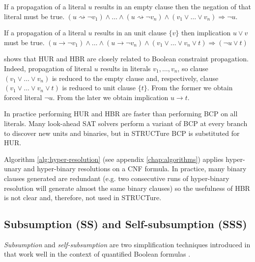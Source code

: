 \begin{myprop}
  If a propagation of a literal $u$ results in an empty clause then
  the negation of that literal must be true.
  $(u \rightsquigarrow \neg v_1) \land \ldots
  \land (u \rightsquigarrow \neg v_n) \land (v_1 \lor \dots \lor v_n)
  \Rightarrow \neg u$. 
\end{myprop}

\begin{myprop}
  If a propagation of a literal $u$ results in an unit clause $\{ v \}$
  then implication $u \lor v$ must be true.
  $(u \rightarrow \neg v_1) \land \ldots
  \land (u \rightarrow \neg v_n)
  \land (v_1 \lor \dots \lor v_n \lor t) \Rightarrow (\neg u \lor t)$
\end{myprop}

\cite{Bacchus03effectivepreprocessing} shows that HUR and HBR
are closely related to Boolean constraint propagation.  Indeed,
propagation of literal $u$ results in literals $v_1, \ldots, v_n$,
so clause $(v_1 \lor \dots \lor v_n)$ is reduced to the empty
clause and, respectively, clause $(v_1 \lor \dots \lor v_n \lor
t)$ is reduced to unit clause $\{ t \}$. From the former we obtain
forced literal $\neg u$. From the later we obtain implication $u
\rightarrow t$.

In practice performing HUR and HBR are faster than performing BCP on
all literals. Many look-ahead SAT solvers perform a variant of BCP
\cite{Freeman:1995:IPS:220639} at every branch to discover new units
and binaries, but in STRUCTure BCP is substituted for HUR.

Algorithm \ref{alg:hyper-resolution} (see appendix
\ref{chap:algorithms}) applies hyper-unary and hyper-binary
resolutions on a CNF formula. In practice, many binary clauses
generated are redundant (e.g. two consecutive runs of hyper-binary
resolution will generate almost the same binary clauses) so the
usefulness of HBR is not clear and, therefore, not used in STRUCTure.


\subsection{Subsumption (SS) and Self-subsumption (SSS)}
\label{ssec:sss}

\emph{Subsumption} and \emph{self-subsumption} are two simplification
techniques introduced in \cite{Een05effectivepreprocessing}
that work well in the context of quantified Boolean formulas
\cite{Biere04resolveand}.

